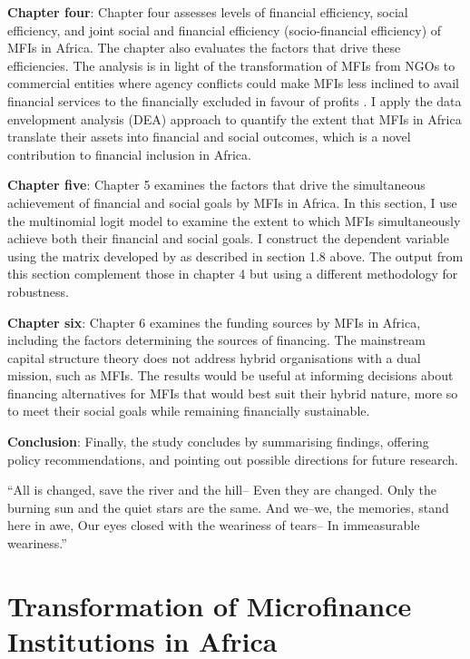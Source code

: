 \documentclass[a4paper, nobind]{templates/ociamthesis}
\begin{document}
\textbf{Chapter four}: Chapter four assesses levels of financial efficiency, social efficiency, and joint social and financial efficiency (socio-financial efficiency) of MFIs in Africa. The chapter also evaluates the factors that drive these efficiencies. The analysis is in light of the transformation of MFIs from NGOs to commercial entities where agency conflicts could make MFIs less inclined to avail financial services to the financially excluded in favour of profits \autocite{serrano2014microfinance}. I apply the data envelopment analysis (DEA) approach to quantify the extent that MFIs in Africa translate their assets into financial and social outcomes, which is a novel contribution to financial inclusion in Africa.

\textbf{Chapter five}: Chapter 5 examines the factors that drive the simultaneous achievement of financial and social goals by MFIs in Africa. In this section, I use the multinomial logit model to examine the extent to which MFIs simultaneously achieve both their financial and social goals. I construct the dependent variable using the matrix developed by \textcite{chattopadhyay2017applicability} as described in section 1.8 above. The output from this section complement those in chapter 4 but using a different methodology for robustness.

\textbf{Chapter six}: Chapter 6 examines the funding sources by MFIs in Africa, including the factors determining the sources of financing. The mainstream capital structure theory does not address hybrid organisations with a dual mission, such as MFIs. The results would be useful at informing decisions about financing alternatives for MFIs that would best suit their hybrid nature, more so to meet their social goals while remaining financially sustainable.

\textbf{Conclusion}: Finally, the study concludes by summarising findings, offering policy recommendations, and pointing out possible directions for future research.

\begin{savequote}
``All is changed, save the river and the hill-- Even they are changed.
Only the burning sun and the quiet stars are the same. And we--we, the
memories, stand here in awe, Our eyes closed with the weariness of
tears-- In immeasurable weariness.''
\end{savequote}



\hypertarget{cites-and-refs}{%
\chapter{Transformation of Microfinance Institutions in Africa}\label{cites-and-refs}}
\end{document}

